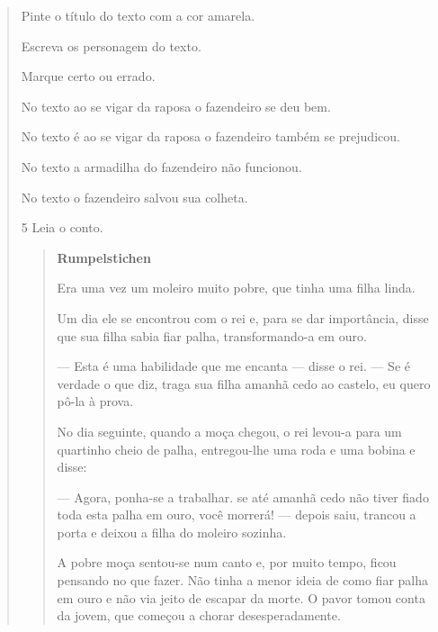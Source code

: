 \begin{verse}
\begin{escolha}
\item Pinte o título do texto com a cor amarela.

\item Escreva os personagem do texto.


\item Marque certo ou errado.

\begin{boxlist}
\boxitem[] No texto ao se vigar da raposa o fazendeiro se deu bem.

\boxitem[] No texto é ao se vigar da raposa o fazendeiro também se prejudicou.

\boxitem[] No texto a armadilha do fazendeiro não funcionou.

\boxitem[] No texto o fazendeiro salvou sua colheta.
\end{boxlist}
\end{escolha}

\num{5} Leia o conto.


\begin{quote}
\textbf{Rumpelstichen}

Era uma vez um moleiro muito pobre, que tinha uma filha linda.

Um dia ele se encontrou com o rei e, para se dar importância,
disse que sua filha sabia fiar palha, transformando-a em ouro.

--- Esta é uma habilidade que me encanta --- disse o
rei. --- Se é verdade o que diz, traga sua filha amanhã cedo ao
castelo, eu quero pô-la à prova.

No dia seguinte, quando a moça chegou, o rei levou-a
para um quartinho cheio de palha, entregou-lhe uma roda e uma
bobina e disse:

--- Agora, ponha-se a trabalhar. se até amanhã cedo
não tiver fiado toda esta palha em ouro, você morrerá! ---
depois saiu, trancou a porta e deixou a filha do moleiro
sozinha.

A pobre moça sentou-se num canto e, por muito tempo,
ficou pensando no que fazer. Não tinha a menor ideia de como
fiar palha em ouro e não via jeito de escapar da morte. O
pavor tomou conta da jovem, que começou a chorar
desesperadamente.
\end{quote}


\end{verse}
